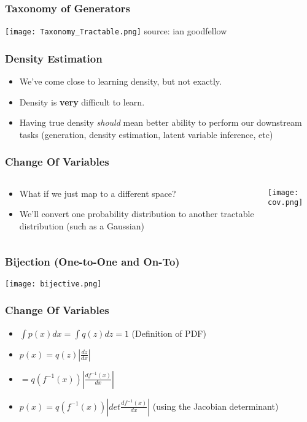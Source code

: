 \begin{frame}
    \frametitle{Taxonomy of Generators}
    \texttt{[image: Taxonomy\_Tractable.png]}
    \null\hfill \tiny{source: ian goodfellow}
\end{frame}

\begin{frame}
    \frametitle{Density Estimation}
    \begin{itemize}
        \item We've come close to learning density, but not exactly. 
        \item Density is \textbf{very} difficult to learn.
        \item Having true density \textit{should} mean better ability to perform
            our downstream tasks (generation, density estimation, latent
            variable inference, etc)
    \end{itemize}
\end{frame}

\begin{frame}
    \frametitle{Change Of Variables}
    \begin{columns}
        \begin{column}{0.49\paperwidth}
            \begin{itemize}
                \item What if we just map to a different space?
                \item We'll convert one probability distribution to another
                    tractable distribution (such as a Gaussian)
            \end{itemize}
        \end{column}
        \begin{column}{0.49\paperwidth}
            \center\texttt{[image: cov.png]}
        \end{column}
    \end{columns}
\end{frame}

\begin{frame}
    \frametitle{Bijection (One-to-One and On-To)}
    \texttt{[image: bijective.png]}
\end{frame}

\begin{frame}
    \frametitle{Change Of Variables}
    \begin{itemize}
        \item<1-> $\int p(x)dx = \int q(z)dz = 1$ (Definition of PDF)
        \item<2-> $p(x) = q(z) \left | \frac{dz}{dx} \right |$
        \item<3-> $= q(f^{-1}(x))\left | \frac{df^{-1}(x)}{dx}\right |$
        \item<4-> $p(x) = q(f^{-1}(x))\left | det\frac{df^{-1}(x)}{dx} \right |$
            (using the Jacobian determinant)
    \end{itemize}
\end{frame}

